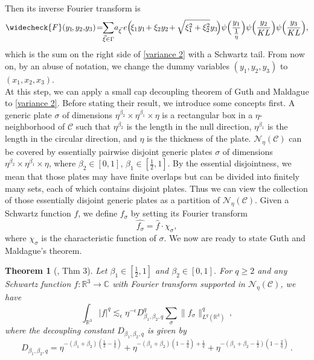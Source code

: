\documentclass[11pt]{amsart}
\numberwithin{equation}{section}
\newtheorem{theorem}{Theorem}[section]
\theoremstyle{definition}
\theoremstyle{proposition}
\begin{document}
Then its inverse Fourier transform is 
\[
\widecheck{F}(y_1\!,y_2,\!y_3)\!= \!\!\sum_{\Vec{\xi}\in \Gamma}\!a_{\Vec{\xi}}\,e\Big(\!\xi_1 y_1\!+\xi_2 y_2\!+\sqrt{\xi_1^2+\xi_2^2}y_3\!\Big) \psi \Big( \frac{y_1}{\frac{1}{\eta}}\Big) \psi \Big(\frac{y_2}{KL}\Big) \psi\Big(\frac{y_3}{KL}\Big),    
\]
which is the sum on the right side of  \eqref{variance 2} with a Schwartz tail. From now on, by an abuse of notation, we change the dummy variables $(y_1,y_2,y_3)$ to $(x_1,x_2,x_3)$. \\


At this step, we can apply a small cap decoupling theorem of Guth and Maldague to \eqref{variance 2}. Before stating their result, we introduce some concepts first. A generic plate $\sigma$ of dimensions $\eta^{\beta_2}\times \eta^{\beta_1}\times \eta$ is a rectangular box in a $\eta$-neighborhood  of $\mathcal C$ such that $\eta^{\beta_2}$ is the length in the null direction, $\eta^{\beta_1}$ is the length in the circular direction, and $\eta$ is the thickness of the plate. $\mathcal N_\eta(\mathcal C)$ can be covered by essentially pairwise disjoint generic plates $\sigma$ of dimensions $\eta^{\beta_2}\times \eta^{\beta_1}\times \eta$,
where $\beta_2\in[0,1]$, $\beta_1\in [\frac{1}{2},1]$.  By the essential disjointness, we mean that those plates may have finite overlaps but can be divided into finitely many sets, each of which contains disjoint plates. Thus we can view the collection 
of those essentially disjoint generic plates as a partition of $\mathcal N_\eta(\mathcal C)$. Given a Schwartz function $f$, we define $f_\sigma$ by setting its Fourier transform 
\[
\widehat{f_\sigma}=\widehat{f} \cdot \chi_\sigma,  
\]
where $\chi_\sigma$ is the characteristic function of $\sigma$. We now are ready to state Guth and Maldague's theorem. 

\begin{theorem}[\cite{GuthMaldague}, Thm 3]\label{small cap decoupling}
Let $\beta_1\in [\frac{1}{2},1]$ and $\beta_2\in[0,1]$. For $q\ge 2$ and any Schwartz function $f:\mathbb R^3\to \mathbb C$ with Fourier transform supported in $\mathcal{N}_\eta(\mathcal{C})$, we have 
\begin{equation}\label{sm-cap}
\int_{\mathbb R^3} |f|^q \lesssim_\epsilon \eta^{-\epsilon}  D^q_{\beta_1, \beta_2, q}   \sum_{\sigma} \|f_\sigma\|_{L^q(\mathbb R^3)}^q \,,
\end{equation}
where the decoupling constant $D_{\beta_1, \beta_2, q}$ is given by
\[
D_{\beta_1,\beta_2,q}=\eta^{-(\beta_1+\beta_2)(\frac{1}{2}-\frac{1}{q})}+\eta^{-(\beta_1+\beta_2)(1-\frac{2}{q})+\frac{1}{q}}+\eta^{-(\beta_1+\beta_2-\frac{1}{2})(1-\frac{2}{q})}   \,.
\]
\end{theorem}
\end{document}
